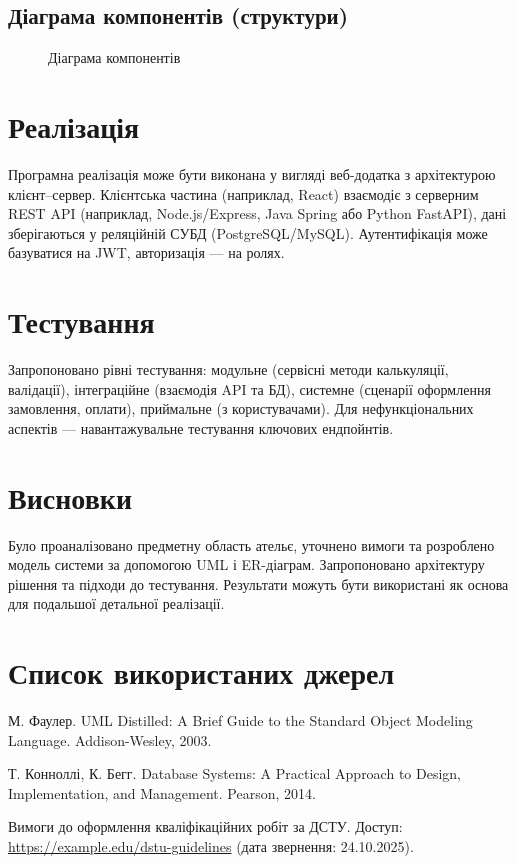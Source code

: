 \documentclass[14pt,a4paper]{extarticle}
\begin{document}
\subsection{Діаграма компонентів (структури)}
\begin{figure}[H]
  \centering
  \caption{Діаграма компонентів}
  \label{fig:components}
\end{figure}

\section{Реалізація}
Програмна реалізація може бути виконана у вигляді веб-додатка з архітектурою клієнт–сервер. Клієнтська частина (наприклад, React) взаємодіє з серверним REST API (наприклад, Node.js/Express, Java Spring або Python FastAPI), дані зберігаються у реляційній СУБД (PostgreSQL/MySQL). Аутентифікація може базуватися на JWT, авторизація — на ролях.

\section{Тестування}
Запропоновано рівні тестування: модульне (сервісні методи калькуляції, валідації), інтеграційне (взаємодія API та БД), системне (сценарії оформлення замовлення, оплати), приймальне (з користувачами). Для нефункціональних аспектів — навантажувальне тестування ключових ендпойнтів.

\section{Висновки}
Було проаналізовано предметну область ательє, уточнено вимоги та розроблено модель системи за допомогою UML і ER-діаграм. Запропоновано архітектуру рішення та підходи до тестування. Результати можуть бути використані як основа для подальшої детальної реалізації.

\section*{Список використаних джерел}
\begin{thebibliography}{9}
М. Фаулер. UML Distilled: A Brief Guide to the Standard Object Modeling Language. Addison-Wesley, 2003.

Т. Конноллі, К. Бегг. Database Systems: A Practical Approach to Design, Implementation, and Management. Pearson, 2014.

Вимоги до оформлення кваліфікаційних робіт за ДСТУ. Доступ: \url{https://example.edu/dstu-guidelines} (дата звернення: 24.10.2025).
\end{thebibliography}
\end{document}
